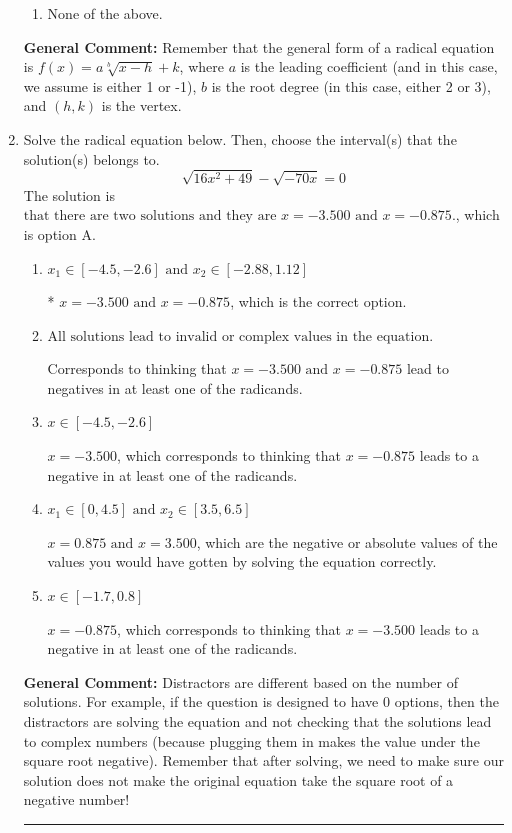 \documentclass{extbook}[14pt]
\newcommand{\litem}[1]{\item #1

\rule{\textwidth}{0.4pt}}
\begin{document}
\begin{enumerate}
{\begin{enumerate}[label=\Alph*.]
\item None of the above.\end{enumerate}
\textbf{General Comment:} Remember that the general form of a radical equation is $ f(x) = a \sqrt[b]{x - h} + k $, where $a$ is the leading coefficient (and in this case, we assume is either 1 or -1), $b$ is the root degree (in this case, either 2 or 3), and $(h, k)$ is the vertex.
}
\litem{
Solve the radical equation below. Then, choose the interval(s) that the solution(s) belongs to.
\[ \sqrt{16 x^2 + 49} - \sqrt{-70 x} = 0 \]The solution is \( \text{that there are two solutions and they are } x = -3.500 \text{ and } x = -0.875. \), which is option A.\begin{enumerate}[label=\Alph*.]
\item \( x_1 \in [-4.5, -2.6] \text{ and } x_2 \in [-2.88,1.12] \)

* $x = -3.500 \text{ and } x = -0.875$, which is the correct option.
\item \( \text{All solutions lead to invalid or complex values in the equation.} \)

Corresponds to thinking that $x = -3.500 \text{ and } x = -0.875$ lead to negatives in at least one of the radicands.
\item \( x \in [-4.5,-2.6] \)

$x = -3.500$, which corresponds to thinking that $x = -0.875$ leads to a negative in at least one of the radicands.
\item \( x_1 \in [0, 4.5] \text{ and } x_2 \in [3.5,6.5] \)

$x = 0.875 \text{ and } x = 3.500$, which are the negative or absolute values of the values you would have gotten by solving the equation correctly.
\item \( x \in [-1.7,0.8] \)

$x = -0.875$, which corresponds to thinking that $x = -3.500$ leads to a negative in at least one of the radicands.
\end{enumerate}

\textbf{General Comment:} Distractors are different based on the number of solutions. For example, if the question is designed to have 0 options, then the distractors are solving the equation and not checking that the solutions lead to complex numbers (because plugging them in makes the value under the square root negative). Remember that after solving, we need to make sure our solution does not make the original equation take the square root of a negative number!
}
\end{enumerate}
\end{document}
